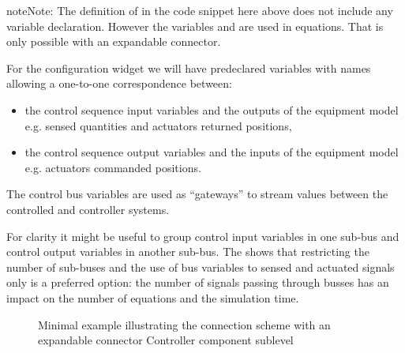 \documentclass[letterpaper,10pt, openany,english]{sphinxmanual}
\begin{document}
\begin{sphinxadmonition}{note}{Note:}
The definition of  in the code snippet here above does not include any variable declaration. However the variables  and  are used in  equations. That is only possible with an expandable connector.

For the configuration widget we will have predeclared variables with names allowing a one-to-one correspondence between:
\begin{itemize}
\item {} 
the control sequence input variables and the outputs of the equipment model e.g. sensed quantities and actuators returned positions,

\item {} 
the control sequence output variables and the inputs of the equipment model e.g. actuators commanded positions.

\end{itemize}

The control bus variables are used as “gateways” to stream values between the controlled and controller systems.

For clarity it might be useful to group control input variables in one sub-bus and control output variables in another sub-bus.
The  shows that restricting the number of sub-buses and the use of bus variables to sensed and actuated signals only is a preferred option: the number of signals passing through busses has an impact on the number of equations and the simulation time.
\end{sphinxadmonition}

\begin{figure}[htbp]
\centering
\capstart

\noindent{}
\caption{Minimal example illustrating the connection scheme with an expandable connector \textendash{} Controller component sublevel}\label{\detokenize{requirements:bustestcontrollerexp}}\end{figure}
\end{document}
